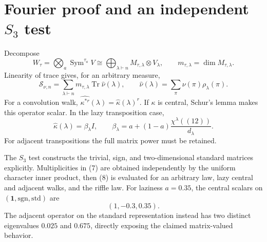 \documentclass[11pt]{article}
\newcommand{\Sfun}{\mathcal S}
\newcommand{\Tr}{\operatorname{Tr}}
\begin{document}
\section{Fourier proof and an independent \texorpdfstring{$S_3$}{S3} test}
Decompose
\begin{equation}
W_\tau=\bigotimes_a\operatorname{Sym}^{\tau_a}V
\cong\bigoplus_{\lambda\vdash n}M_{\tau,\lambda}\otimes V_\lambda,
\qquad m_{\tau,\lambda}=\dim M_{\tau,\lambda}.            \tag{7}
\end{equation}
Linearity of trace gives, for an arbitrary measure,
\begin{equation}
[\mathbf t^\tau]\Sfun_{\nu,n}
=\sum_{\lambda\vdash n}m_{\tau,\lambda}
\Tr\widehat\nu(\lambda),
\qquad
\widehat\nu(\lambda)=\sum_\pi\nu(\pi)\rho_\lambda(\pi). \tag{8}
\end{equation}
For a convolution walk, $\widehat{\kappa^{*r}}(\lambda)
=\widehat\kappa(\lambda)^r$.  If $\kappa$ is central, Schur's lemma makes
this operator scalar.  In the lazy transposition case,
\begin{equation}
\widehat\kappa(\lambda)=\beta_\lambda I,
\qquad
\beta_\lambda=a+(1-a)\frac{\chi^\lambda((12))}{d_\lambda}. \tag{9}
\end{equation}
For adjacent transpositions the full matrix power must be retained.

The $S_3$ test constructs the trivial, sign, and two-dimensional standard
matrices explicitly.  Multiplicities in (7) are obtained independently by
the uniform character inner product, then (8) is evaluated for an arbitrary
law, lazy central and adjacent walks, and the riffle law.  For laziness
$a=0.35$, the central scalars on $(\mathbf1,\mathrm{sgn},\mathrm{std})$ are
\begin{equation}
(1,-0.3,0.35).                                               \tag{10}
\end{equation}
The adjacent operator on the standard representation instead has two distinct
eigenvalues $0.025$ and $0.675$, directly exposing the claimed matrix-valued
behavior.
\end{document}
